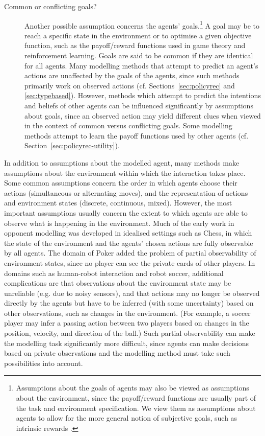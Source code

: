 \documentclass[final,1p,times,authoryear]{elsarticle}
\begin{document}
\begin{description}
	\item[Common or conflicting goals?]  Another possible assumption concerns the agents' goals.\footnote{Assumptions about the goals of agents may also be viewed as assumptions about the environment, since the payoff/reward functions are usually part of the task and environment specification. We view them as assumptions about agents to allow for the more general notion of subjective goals, such as intrinsic rewards \citep{sbc2005}.} A goal may be to reach a specific state in the environment or to optimise a given objective function, such as the payoff/reward functions used in game theory and reinforcement learning. Goals are said to be common if they are identical for all agents. Many modelling methods that attempt to predict an agent's actions are unaffected by the goals of the agents, since such methods primarily work on observed actions (cf. Sections~\ref{sec:policyrec} and \ref{sec:typebased}). However, methods which attempt to predict the intentions and beliefs of other agents can be influenced significantly by assumptions about goals, since an observed action may yield different clues when viewed in the context of common versus conflicting goals. Some modelling methods attempt to learn the payoff functions used by other agents (cf. Section~\ref{sec:policyrec-utility}).
\end{description}

In addition to assumptions about the modelled agent, many methods make assumptions about the environment within which the interaction takes place. Some common assumptions concern the order in which agents choose their actions (simultaneous or alternating moves), and the representation of actions and environment states (discrete, continuous, mixed). However, the most important assumptions usually concern the extent to which agents are able to observe what is happening in the environment. Much of the early work in opponent modelling was developed in idealised settings such as Chess, in which the state of the environment and the agents' chosen actions are fully observable by all agents. The domain of Poker added the problem of partial observability of environment states, since no player can see the private cards of other players. In domains such as human-robot interaction and robot soccer, additional complications are that observations about the environment state may be unreliable (e.g. due to noisy sensors), and that actions may no longer be observed directly by the agents but have to be inferred (with some uncertainty) based on other observations, such as changes in the environment. (For example, a soccer player may infer a passing action between two players based on changes in the position, velocity, and direction of the ball.) Such partial observability can make the modelling task significantly more difficult, since agents can make decisions based on private observations and the modelling method must take such possibilities into account.
\end{document}
